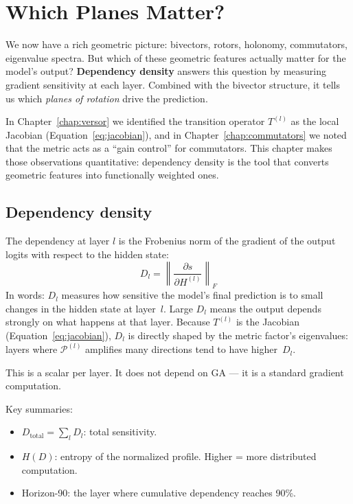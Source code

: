 \documentclass[11pt, twoside, openright]{memoir}
\newcommand{\metric}[1]{\mathcal{P}^{(#1)}} %
\numberwithin{equation}{chapter}
\begin{document}
\chapter{Which Planes Matter?}
\label{chap:dependency}

\begin{whycare}
We now have a rich geometric picture: bivectors, rotors, holonomy,
commutators, eigenvalue spectra.  But which of these geometric features
actually matter for the model's output?  \textbf{Dependency density}
answers this question by measuring gradient sensitivity at each layer.
Combined with the bivector structure, it tells us which \emph{planes of
rotation} drive the prediction.

In Chapter~\ref{chap:versor} we identified the transition operator $T^{(l)}$
as the local Jacobian (Equation~\ref{eq:jacobian}), and in
Chapter~\ref{chap:commutators} we noted that the metric acts as a
``gain control'' for commutators.  This chapter makes those observations
quantitative: dependency density is the tool that converts geometric
features into functionally weighted ones.
\end{whycare}

\section{Dependency density}

The dependency at layer $l$ is the Frobenius norm of the gradient of the
output logits with respect to the hidden state:
\begin{equation}
  D_l = \left\|\frac{\partial s}{\partial H^{(l)}}\right\|_F
\end{equation}
In words: $D_l$ measures how sensitive the model's final prediction is
to small changes in the hidden state at layer~$l$.  Large $D_l$ means
the output depends strongly on what happens at that layer.  Because
$T^{(l)}$ is the Jacobian (Equation~\ref{eq:jacobian}), $D_l$ is
directly shaped by the metric factor's eigenvalues: layers where
$\metric{l}$ amplifies many directions tend to have higher~$D_l$.

This is a scalar per layer.  It does not depend on GA --- it is a
standard gradient computation.

Key summaries:
\begin{itemize}[nosep]
\item $D_{\text{total}} = \sum_l D_l$: total sensitivity.
\item $H(D)$: entropy of the normalized profile.  Higher = more
  distributed computation.
\item Horizon-90: the layer where cumulative dependency reaches 90\%.
\end{itemize}
\end{document}
